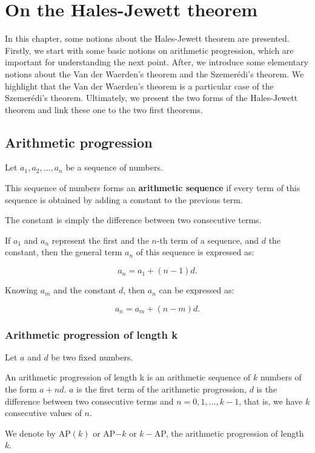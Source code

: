 \chapter{On the Hales-Jewett theorem}

In this chapter, some notions about the Hales-Jewett theorem are presented. Firstly, we start with some basic notions on arithmetic progression, which are important for understanding the next point. After, we introduce some elementary notions about the Van der Waerden’s theorem and the Szemerédi's theorem. We highlight that  the Van der Waerden's theorem is a particular case of the  Szemerédi's theorem. Ultimately, we present the two forms of the Hales-Jewett theorem and link these one to the two first theorems.

\section{Arithmetic progression}


\begin{defn}
Let $a_1, a_2, \ldots, a_n$ be a sequence of numbers.  

This sequence of numbers forms an \textbf{arithmetic sequence} if every term of this sequence is obtained by adding a constant to the previous term.
\end{defn}
The constant is simply the difference between two consecutive terms.

If $a_1$ and $a_n$ represent the first and the $n$-th term of a sequence, and $d$ the constant, then the general term $a_n$ of this sequence is expressed as:

$$a_n=a_1+(n-1)d.$$

Knowing $a_m$ and the constant $d$, then $a_n$ can be expressed as:
 
$$a_n=a_m+(n-m)d.$$

\subsection{Arithmetic progression of length k}


Let $a$ and $d$ be two fixed numbers.

An arithmetic progression of length k is an arithmetic sequence of $k$ numbers of the form $a+nd.$ $a$ is the first term of the arithmetic progression, $d$ is the difference between two consecutive terms and $n=0,1, \ldots, k-1$, that is, we have $k$ consecutive values of $n.$ 

We denote by AP$(k)$ or AP$-k$ or $k-$AP, the arithmetic progression of length $k.$


